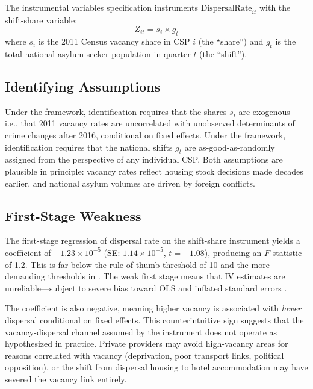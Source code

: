 \documentclass[12pt]{article}
\begin{document}
The instrumental variables specification instruments $\text{DispersalRate}_{it}$ with the shift-share variable:
\begin{equation}
Z_{it} = s_i \times g_t
\label{eq:ssiv}
\end{equation}
where $s_i$ is the 2011 Census vacancy share in CSP $i$ (the ``share'') and $g_t$ is the total national asylum seeker population in quarter $t$ (the ``shift'').

\subsection{Identifying Assumptions}

Under the \citet{goldsmith2020bartik} framework, identification requires that the shares $s_i$ are exogenous---i.e., that 2011 vacancy rates are uncorrelated with unobserved determinants of crime changes after 2016, conditional on fixed effects. Under the \citet{borusyak2022quasi} framework, identification requires that the national shifts $g_t$ are as-good-as-randomly assigned from the perspective of any individual CSP. Both assumptions are plausible in principle: vacancy rates reflect housing stock decisions made decades earlier, and national asylum volumes are driven by foreign conflicts.

\subsection{First-Stage Weakness}

The first-stage regression of dispersal rate on the shift-share instrument yields a coefficient of $-1.23 \times 10^{-5}$ (SE: $1.14 \times 10^{-5}$, $t = -1.08$), producing an $F$-statistic of 1.2. This is far below the \citet{staiger1997instrumental} rule-of-thumb threshold of 10 and the more demanding thresholds in \citet{stock2005testing}. The weak first stage means that IV estimates are unreliable---subject to severe bias toward OLS and inflated standard errors \citep{lee2022valid}.

The coefficient is also negative, meaning higher vacancy is associated with \textit{lower} dispersal conditional on fixed effects. This counterintuitive sign suggests that the vacancy-dispersal channel assumed by the instrument does not operate as hypothesized in practice. Private providers may avoid high-vacancy areas for reasons correlated with vacancy (deprivation, poor transport links, political opposition), or the shift from dispersal housing to hotel accommodation may have severed the vacancy link entirely.
\end{document}

